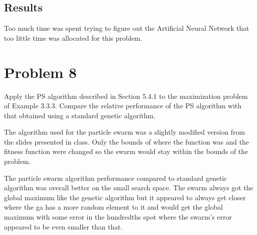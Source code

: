 \subsection{Results}
Too much time was spent trying to figure out the Artificial Neural Network that too little time was allocated for this problem. 

\section{Problem 8}
Apply the PS algorithm described in Section 5.4.1 to the maximization problem of Example 3.3.3. Compare the relative performance of the PS algorithm with that obtained using a standard genetic algorithm.
\newline
\newline
\par
The algorithm used for the particle swarm was a slightly modified version from the slides presented in class. Only the bounds of where the function was and the fitness function were changed so the swarm would stay within the bounds of the problem.
\par
The particle swarm algorithm performance compared to standard genetic algorithm was overall better on the small search space. The swarm always got the global maximum like the genetic algorithm but it appeared to always get closer where the ga has a more random element to it and would get the global maximum with some error in the hundredths spot where the swarm's error appeared to be even smaller than that.



